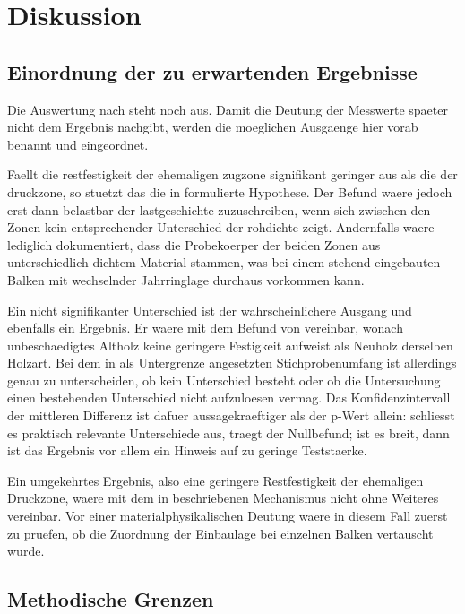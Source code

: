 \chapter{Diskussion}
\label{ch:discussion}

\section{Einordnung der zu erwartenden Ergebnisse}
\label{sec:interpretation}

Die Auswertung nach  steht noch aus. Damit die Deutung der
Messwerte spaeter nicht dem Ergebnis nachgibt, werden die moeglichen Ausgaenge
hier vorab benannt und eingeordnet.

Faellt die \gls{restfestigkeit} der ehemaligen \gls{zugzone} signifikant
geringer aus als die der \gls{druckzone}, so stuetzt das die in
 formulierte Hypothese. Der Befund waere jedoch erst dann
belastbar der \gls{lastgeschichte} zuzuschreiben, wenn sich zwischen den Zonen
kein entsprechender Unterschied der \gls{rohdichte} zeigt. Andernfalls waere
lediglich dokumentiert, dass die Probekoerper der beiden Zonen aus
unterschiedlich dichtem Material stammen, was bei einem stehend eingebauten
Balken mit wechselnder Jahrringlage durchaus vorkommen kann.

Ein nicht signifikanter Unterschied ist der wahrscheinlichere Ausgang und
ebenfalls ein Ergebnis. Er waere mit dem Befund von \textcite{rug1989}
vereinbar, wonach unbeschaedigtes Altholz keine geringere Festigkeit aufweist
als Neuholz derselben Holzart. Bei dem in  als Untergrenze
angesetzten Stichprobenumfang ist allerdings genau zu unterscheiden, ob kein
Unterschied besteht oder ob die Untersuchung einen bestehenden Unterschied
nicht aufzuloesen vermag. Das Konfidenzintervall der mittleren Differenz ist
dafuer aussagekraeftiger als der p-Wert allein: schliesst es praktisch
relevante Unterschiede aus, traegt der Nullbefund; ist es breit, dann ist das
Ergebnis vor allem ein Hinweis auf zu geringe Teststaerke.

Ein umgekehrtes Ergebnis, also eine geringere Restfestigkeit der ehemaligen
Druckzone, waere mit dem in  beschriebenen Mechanismus nicht
ohne Weiteres vereinbar. Vor einer materialphysikalischen Deutung waere in
diesem Fall zuerst zu pruefen, ob die Zuordnung der Einbaulage bei einzelnen
Balken vertauscht wurde.

\section{Methodische Grenzen}
\label{sec:limitations}

